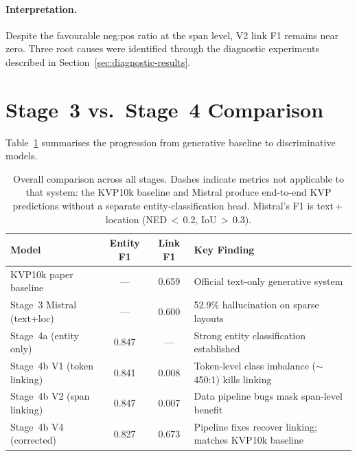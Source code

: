 \paragraph{Interpretation.}
Despite the favourable neg:pos ratio at the span level, V2 link F1 remains
near zero.  Three root causes were identified through the diagnostic
experiments described in Section~\ref{sec:diagnostic-results}.

\section{Stage~3 vs.\ Stage~4 Comparison}
\label{sec:comparison}

Table~\ref{tab:overall-comparison} summarises the progression from generative
baseline to discriminative models.

\begin{table}[ht]
  \centering
  \caption{Overall comparison across all stages. Dashes indicate metrics not
    applicable to that system: the KVP10k baseline and Mistral produce
    end-to-end KVP predictions without a separate entity-classification head.
    Mistral's F1 is text\,+\,location (NED\,$<$\,0.2, IoU\,$>$\,0.3).}
  \label{tab:overall-comparison}
  \small
  \begin{tabular}{@{}lccp{5.5cm}@{}}
    \toprule
    \textbf{Model} & \textbf{Entity F1} & \textbf{Link F1} & \textbf{Key Finding} \\
    \midrule
    KVP10k paper baseline     & ---   & 0.659 & Official text-only generative system \\
    Stage~3 Mistral (text+loc) & ---  & 0.600 & 52.9\% hallucination on sparse layouts \\
    Stage~4a (entity only)     & 0.847 & ---   & Strong entity classification established \\
    Stage~4b V1 (token linking) & 0.841 & 0.008 & Token-level class imbalance ($\sim$450:1) kills linking \\
    Stage~4b V2 (span linking)  & 0.847 & 0.007 & Data pipeline bugs mask span-level benefit \\
    Stage~4b V4 (corrected)     & 0.827 & 0.673 & Pipeline fixes recover linking; matches KVP10k baseline \\
    \bottomrule
  \end{tabular}
\end{table}

